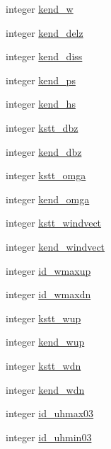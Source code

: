 \begin{DoxyCompactItemize}
integer \hyperlink{classfv__nggps__diags__mod_a7448a16d1d56fd8a7b71ed79418d1fca}{kend\-\_\-w}
\item 
integer \hyperlink{classfv__nggps__diags__mod_a1032edab5be3a430c7089c2dd5b6f2bb}{kend\-\_\-delz}
\item 
integer \hyperlink{classfv__nggps__diags__mod_a37a13813d7e5941869d5666844dc3601}{kend\-\_\-diss}
\item 
integer \hyperlink{classfv__nggps__diags__mod_a2bc1187c816698a5e9ad14f3769a904a}{kend\-\_\-ps}
\item 
integer \hyperlink{classfv__nggps__diags__mod_af675001c796dc16dbbd5642fb38c9247}{kend\-\_\-hs}
\item 
integer \hyperlink{classfv__nggps__diags__mod_a6197e3be2df8bd2599697c61d5ed950c}{kstt\-\_\-dbz}
\item 
integer \hyperlink{classfv__nggps__diags__mod_aa0dbd9fec62f6dc0ed89809c9e9b6074}{kend\-\_\-dbz}
\item 
integer \hyperlink{classfv__nggps__diags__mod_aa4455319113ad1862929a6fdf72a5beb}{kstt\-\_\-omga}
\item 
integer \hyperlink{classfv__nggps__diags__mod_a4e11455c15981a042cd6cc91bd000576}{kend\-\_\-omga}
\item 
integer \hyperlink{classfv__nggps__diags__mod_ad2da0c51ff10c97635de92984451f577}{kstt\-\_\-windvect}
\item 
integer \hyperlink{classfv__nggps__diags__mod_a0e04e352b7e1e2353e3a2e9245662270}{kend\-\_\-windvect}
\item 
integer \hyperlink{classfv__nggps__diags__mod_a059ef910811a03117bf40a1406521276}{id\-\_\-wmaxup}
\item 
integer \hyperlink{classfv__nggps__diags__mod_a3d99dc518af844fdea2b88da471ff681}{id\-\_\-wmaxdn}
\item 
integer \hyperlink{classfv__nggps__diags__mod_a86051f0376102e15a8a1a0fc8fe5429f}{kstt\-\_\-wup}
\item 
integer \hyperlink{classfv__nggps__diags__mod_a117adcb804018f56ea41b9582964a174}{kend\-\_\-wup}
\item 
integer \hyperlink{classfv__nggps__diags__mod_aba42685aa149ce68cbfb653d3263842d}{kstt\-\_\-wdn}
\item 
integer \hyperlink{classfv__nggps__diags__mod_ac1745bf6697cf2d62afe2bc2cf0e862b}{kend\-\_\-wdn}
\item 
integer \hyperlink{classfv__nggps__diags__mod_aa5d2111d9515e6bc6cf874a484c19da2}{id\-\_\-uhmax03}
\item 
integer \hyperlink{classfv__nggps__diags__mod_ad44911da667d63fa3868d6a7de563a06}{id\-\_\-uhmin03}

\end{DoxyCompactItemize}
